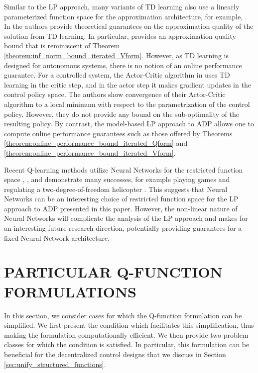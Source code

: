 \documentclass[journal]{IEEEtran}
\newcommand{\textQ}{Q}
\begin{document}
Similar to the LP approach, many variants of TD learning also use a linearly parameterized function space for the approximation architecture, for example,  \cite{sutton_1988_TDlearning,bradtke_1996_lstd,boyan_2002_lstd}. In \cite{tsitsiklis_1997_TD_analysis} the authors provide theoretical guarantees on the approximation quality of the solution from TD learning. In particular, \cite[Theorem 1]{tsitsiklis_1997_TD_analysis} provides an approximation quality bound that is reminiscent of Theorem \ref{theorem:inf_norm_bound_iterated_Vform}. However, as TD learning is designed for autonomous systems, there is no notion of an online performance guarantee.
For a controlled system, the Actor-Critic algorithm in \cite{konda_2003_actorcritic_journal} uses TD learning in the critic step, and in the actor step it makes gradient updates in the control policy space. The authors show convergence of their Actor-Critic algorithm to a local minimum with respect to the parametrization of the control policy. However, they do not provide any bound on the sub-optimality of the resulting policy.
By contrast, the model-based LP approach to ADP allows one to compute online performance guarantees such as those offered by Theorems \ref{theorem:online_performance_bound_iterated_Qform} and \ref{theorem:online_performance_bound_iterated_Vform}.



Recent \textQ-learning methods utilize Neural Networks for the restricted function space \cite[Section 6.3.1]{bertsekas_2017_DP_vol1}, \cite{reviewer_suggestion_2017_policy_gradient}, and demonstrate many successes, for example playing games \cite{google_2015_atari,google_2017_alphago} and regulating a two-degree-of-freedom helicopter \cite{reviewer_suggestion_2018_helicopter}.
This suggests that Neural Networks can be an interesting choice of restricted function space for the LP approach to ADP presented in this paper.
However, the non-linear nature of Neural Networks will complicate the analysis of the LP approach and makes for an interesting future research direction, potentially providing guarantees for a fixed Neural Network architecture. 




\section{PARTICULAR \textQ-FUNCTION FORMULATIONS} \label{sec:unify}


In this section, we consider cases for which the \textQ-function formulation can be simplified. We first present the condition which facilitates this simplification, thus making the formulation computationally efficient. We then provide two problem classes for which the condition is satisfied. In particular, this formulation can be beneficial for the decentralized control designs that we discuss in Section \ref{sec:unify_structured_functions}.
\end{document}
